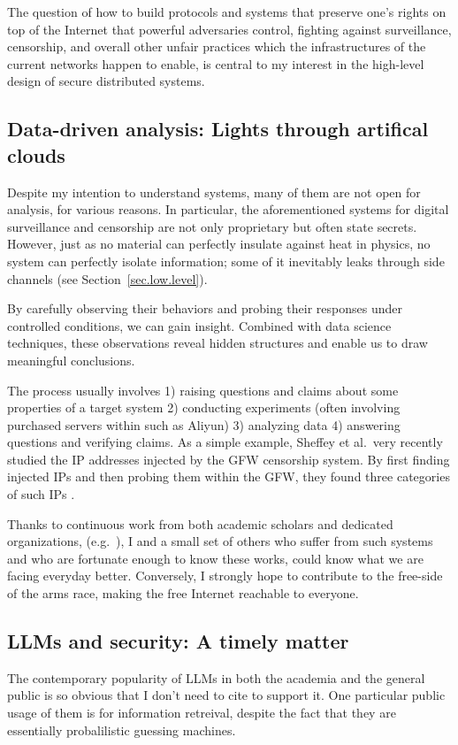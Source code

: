 \documentclass[10pt]{article}
\begin{document}
The question of how to build protocols and systems that preserve one's rights
on top of the Internet that powerful adversaries control, fighting against
surveillance, censorship, and overall other unfair practices which the
infrastructures of the current networks happen to enable, is central to my
interest in the high-level design of secure distributed systems.


\subsection[Data-driven analysis]{
Data-driven analysis: Lights through artifical clouds}
Despite my intention to understand systems, many of them are not open for
analysis, for various reasons. In particular, the aforementioned systems for
digital surveillance and censorship are not only proprietary but often state
secrets. However, just as no material can perfectly insulate against heat in
physics, no system can perfectly isolate information; some of it inevitably
leaks through side channels (see Section~\ref{sec.low.level}). 

By carefully observing their behaviors and probing their responses under
controlled conditions, we can gain insight. Combined with data science
techniques, these observations reveal hidden structures and enable us to draw
meaningful conclusions.

The process usually involves 1) raising questions and claims about some
properties of a target system 2) conducting experiments (often involving
purchased servers within such as Aliyun) 3) analyzing data 4) answering
questions and verifying claims. As a simple example, Sheffey et al.\ very
recently studied the IP addresses injected by the GFW censorship system. By
first finding injected IPs and then probing them within the GFW, they found
three categories of such IPs \cite{gfw.injected.ip}. 

Thanks to continuous work from both academic scholars and dedicated
organizations, (e.g.\ \cite{data.analysis.1, data.analysis.2, censor.block.6}),
I and a small set of others who suffer from such systems and who are fortunate
enough to know these works, could know what we are facing everyday better.
Conversely, I strongly hope to contribute to the free-side of the arms race,
making the free Internet reachable to everyone.

\subsection[LLMs and security]{LLMs and security: A timely matter}
The contemporary popularity of LLMs in both the academia and the general public
is so obvious that I don't need to cite to support it. One particular public
usage of them is for information retreival, despite the fact that they are
essentially probalilistic guessing machines. 
\end{document}

